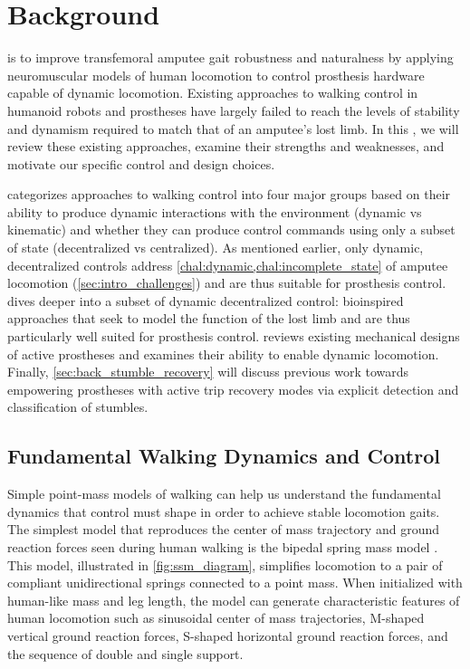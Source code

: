 \chapter{Background}\label{sec:back}
 is to improve transfemoral amputee
gait robustness and naturalness by applying neuromuscular models of human
locomotion to control prosthesis hardware capable of dynamic locomotion.
Existing approaches to walking control in humanoid robots and prostheses have
largely failed to reach the levels of stability and dynamism required to match
that of an amputee's lost limb. In this , we will review
these existing approaches, examine their strengths and weaknesses, and motivate
our specific control and design choices.

 categorizes approaches to walking control into
four major groups based on their ability to produce dynamic interactions with
the environment (dynamic vs kinematic) and whether they can produce control
commands using only a subset of state (decentralized vs centralized). As
mentioned earlier, only dynamic, decentralized controls address
\cref{chal:dynamic,chal:incomplete_state} of amputee locomotion
(\cref{sec:intro_challenges}) and are thus suitable for prosthesis control.
 dives deeper into a subset of dynamic
decentralized control: bioinspired approaches that seek to model the function of
the lost limb and are thus particularly well suited for prosthesis control.
 reviews existing mechanical designs of active
prostheses and examines their ability to enable dynamic locomotion. Finally,
\cref{sec:back_stumble_recovery} will discuss previous work towards empowering
prostheses with active trip recovery modes via explicit detection and
classification of stumbles. 

\section{Fundamental Walking Dynamics and
Control}\label{sec:back_walking_review}

Simple point-mass models of walking can help us understand the fundamental
dynamics that control must shape in order to achieve stable locomotion gaits.
The simplest model that reproduces the center of mass trajectory and ground
reaction forces seen during human walking is the bipedal spring mass model
\citep{geyer2006compliant}. This model, illustrated in \cref{fig:ssm_diagram},
simplifies locomotion to a pair of compliant unidirectional springs connected to
a point mass. When initialized with human-like mass and leg length, the model
can generate characteristic features of human locomotion such as sinusoidal
center of mass trajectories, M-shaped vertical ground reaction forces, S-shaped
horizontal ground reaction forces, and the sequence of double and single
support. 

